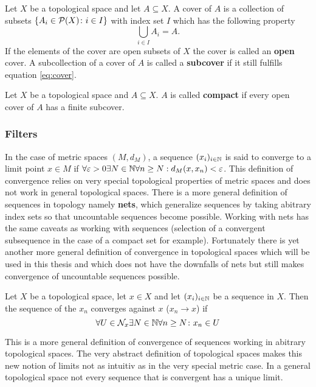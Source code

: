 \begin{defin}
  Let $X$ be a topological space and let $A \subseteq X$. A cover of $A$ is a collection of subsets $\left\{A_i \in \P(X)\colon i \in I \right\}$ with index set $I$ which has the following property
  \begin{equation}\label{eq:cover}
    \bigcup\limits_{i\in I}A_i = A.
  \end{equation}
  If the elements of the cover are open subsets of $X$ the cover is called an \textbf{open} cover.
  A subcollection of a cover of $A$ is called a \textbf{subcover} if it still fulfills equation \ref{eq:cover}.
\end{defin}

\begin{defin}
  Let $X$ be a topological space and $A \subseteq X$. $A$ is called \textbf{compact} if every open cover of $A$ has a finite subcover. 
\end{defin}

\subsubsection{Filters}
In the case of metric spaces $(M, d_M)$, a sequence $(x_i)_{i\in \N}$ is said to converge to a limit point $x \in M$ if $\forall \varepsilon>0\exists N \in \N\forall n \geq N: d_M(x, x_n) < \varepsilon$. This definition of convergence relies on very special topological properties of metric spaces and does not work in general topological spaces. There is a more general definition of sequences in topology namely \textbf{nets}, which generalize sequences by taking abitrary index sets so that uncountable sequences become possible. Working with nets has the same caveats as working with sequences (selection of a convergent subsequence in the case of a compact set for example). Fortunately there is yet another more general definition of convergence in topological spaces which will be used in this thesis and which does not have the downfalls of nets but still makes convergence of uncountable sequences possible.

\begin{defin}\label{def:convtop}
  Let $X$ be a topological space, let $x \in X$ and let $(x_i)_{i \in \N}$ be a sequence in $X$. Then the sequence of the $x_n$ converges against $x$ ($x_n \to x$) if
  \begin{equation*}
    \forall U \in \mathcal{N}_x\exists N\in\N\forall n \geq N\colon x_n \in U
  \end{equation*}
\end{defin}
This is a more general definition of convergence of sequences working in abitrary topological spaces. The very abstract definition of topological spaces makes this new notion of limits not as intuitiv as in the very special metric case. In a general topological space not every sequence that is convergent has a unique limit.

